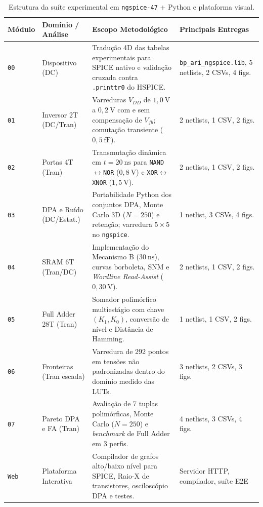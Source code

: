 \begin{table}[htbp]
\centering
\caption{Estrutura da su\'{i}te experimental em \texttt{ngspice-47} + Python e plataforma visual.}
\label{tab:resumo_modulos}
\footnotesize
\begin{tabularx}{\textwidth}{l l X l}
\toprule
\textbf{M\'{o}dulo} & \textbf{Dom\'{i}nio / An\'{a}lise} & \textbf{Escopo Metodol\'{o}gico} & \textbf{Principais Entregas} \\
\midrule
\texttt{00} & Dispositivo (DC) & Tradu\c{c}\~{a}o 4D das tabelas experimentais para SPICE nativo e valida\c{c}\~{a}o cruzada contra \texttt{.printtr0} do HSPICE. & \texttt{bp\_ari\_ngspice.lib}, 5 netlists, 2 CSVs, 4 figs. \\
\texttt{01} & Inversor 2T (DC/Tran) & Varreduras $V_{DD}$ de $1{,}0\ \text{V}$ a $0{,}2\ \text{V}$ com e sem compensa\c{c}\~{a}o de $V_{fb}$; comuta\c{c}\~{a}o transiente ($0{,}5\ \text{fF}$). & 2 netlists, 1 CSV, 2 figs. \\
\texttt{02} & Portas 4T (Tran) & Transmuta\c{c}\~{a}o din\^{a}mica em $t=20\ \text{ns}$ para \texttt{NAND}$\leftrightarrow$\texttt{NOR} ($0{,}8\ \text{V}$) e \texttt{XOR}$\leftrightarrow$\texttt{XNOR} ($1{,}5\ \text{V}$). & 2 netlists, 1 CSV, 2 figs. \\
\texttt{03} & DPA e Ru\'{i}do (DC/Estat.) & Portabilidade Python dos conjuntos DPA, Monte Carlo 3D ($N=250$) e reten\c{c}\~{a}o; varredura $5\times 5$ no \texttt{ngspice}. & 1 netlist, 3 CSVs, 4 figs. \\
\texttt{04} & SRAM 6T (Tran/DC) & Implementa\c{c}\~{a}o do Mecanismo B ($30\ \text{ns}$), curvas borboleta, SNM e \textit{Wordline Read-Assist} ($0{,}30\ \text{V}$). & 2 netlists, 1 CSV, 2 figs. \\
\texttt{05} & Full Adder 28T (Tran) & Somador polim\'{o}rfico multiest\'{a}gio com chave $(K_1, K_0)$, convers\~{a}o de n\'{i}vel e Dist\^{a}ncia de Hamming. & 1 netlist, 1 CSV, 2 figs. \\
\texttt{06} & Fronteiras (Tran escada) & Varredura de 292 pontos em tens\~{o}es n\~{a}o padronizadas dentro do dom\'{i}nio medido das LUTs. & 3 netlists, 2 CSVs, 3 figs. \\
\texttt{07} & Pareto DPA e FA (Tran) & Avalia\c{c}\~{a}o de 7 tuplas polim\'{o}rficas, Monte Carlo ($N=250$) e \textit{benchmark} de Full Adder em 3 perfis. & 4 netlists, 3 CSVs, 4 figs. \\
\texttt{Web} & Plataforma Interativa & Compilador de grafos alto/baixo n\'{i}vel para SPICE, Raio-X de transistores, oscilosc\'{o}pio DPA e testes. & Servidor HTTP, compilador, su\'{i}te E2E \\
\bottomrule
\end{tabularx}
\end{table}


